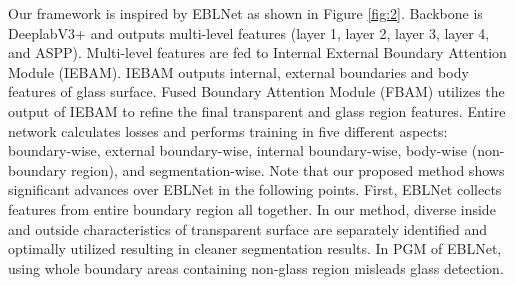 \documentclass[10pt,twocolumn,letterpaper]{article}
\begin{document}
Our framework is inspired by EBLNet\cite{he2021enhanced} as shown in Figure \ref{fig:2}. Backbone is DeeplabV3+\cite{chen2018reverse} and outputs multi-level features (layer 1, layer 2, layer 3, layer 4, and ASPP\cite{chen2018reverse}). Multi-level features are fed to Internal External Boundary Attention Module (IEBAM). IEBAM outputs internal, external boundaries and body features of glass surface. Fused Boundary Attention Module (FBAM) utilizes the output of IEBAM to refine the final transparent and glass region features. Entire network calculates losses and performs training in five different aspects: boundary-wise, external boundary-wise, internal boundary-wise, body-wise (non-boundary region), and segmentation-wise. Note that our proposed method shows significant advances over EBLNet in the following points. First, EBLNet collects features from entire boundary region all together. In our method, diverse inside and outside characteristics of transparent surface are separately identified and optimally utilized resulting in cleaner segmentation results. In PGM of EBLNet, using whole boundary areas containing non-glass region misleads glass detection. 
\end{document}
